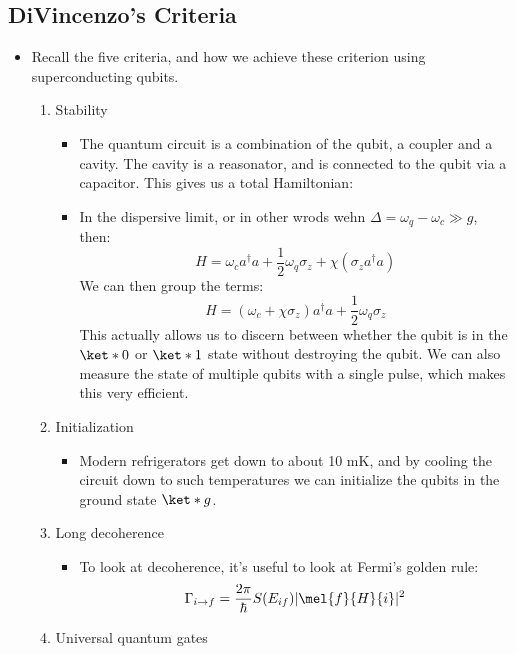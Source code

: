 \subsection{DiVincenzo's Criteria}
\begin{itemize}
	\item Recall the five criteria, and how we achieve these criterion using superconducting qubits.  
		\begin{enumerate}[label=\arabic*)]
			\item Stability
				\begin{itemize}
					\item The quantum circuit is a combination of the qubit, a coupler and a cavity. The cavity 
						is a reasonator, and is connected to the qubit via a capacitor. This gives us a total 
						Hamiltonian:
					\item In the dispersive limit, or in other wrods wehn \( \Delta = \omega_q - \omega_c \gg g \), 
						then:
						\[
						H = \omega_c a^{\dagger} a + \frac{1}{2}\omega_q \sigma_z + \chi(\sigma_z a^{\dagger}a)
						\] 
						We can then group the terms:
						\[
						H = (\omega_c + \chi \sigma_z) a^{\dagger}a + \frac{1}{2}\omega_q \sigma_z
						\] 
						This actually allows us to discern between whether the qubit is in the \( \ket*{0} \) or 
						\( \ket*{1} \) state without destroying the qubit. We can also measure the state of multiple 
						qubits with a single pulse, which makes this very efficient. 
				\end{itemize}
			\item Initialization 
				\begin{itemize}
					\item Modern refrigerators get down to about 10 mK, 
						and by cooling the circuit down to such temperatures we can 
						initialize the qubits in the ground state  \( \ket*{g} \). 
				\end{itemize}
			\item Long decoherence

				\begin{itemize}
					\item To look at decoherence, it's useful to look at Fermi's golden rule:
						\[
							\Gamma_{i \to f} = \frac{2\pi}{\hbar} S(E_{if}) |\mel{f}{H}{i}|^2
						\] 
				\end{itemize}
			\item Universal quantum gates


\end{enumerate}
\end{itemize}
